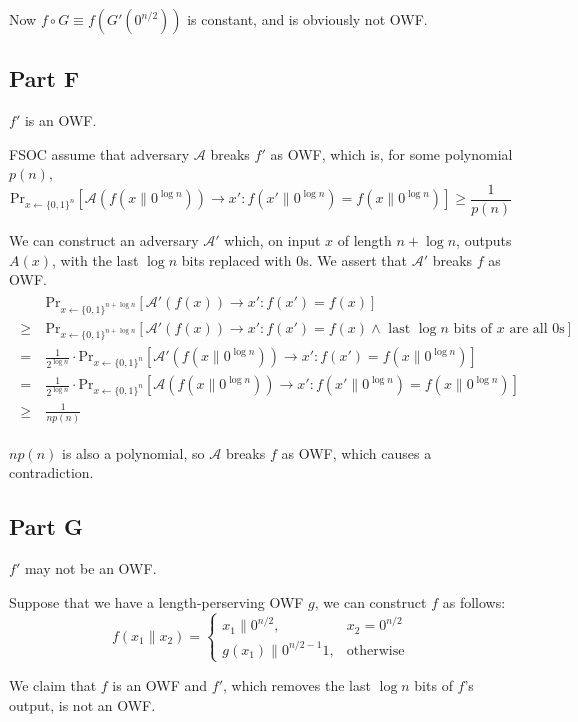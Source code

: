 \documentclass[8pt]{article}
\theoremstyle{compact}
\def\ge{\geqslant}
\begin{document}
Now $f \circ G \equiv f(G'(0^{n/2}))$ is constant, and is obviously not OWF. 
\subsection*{Part F}
$f'$ is an OWF.

FSOC assume that adversary $\mathcal A$ breaks $f'$ as OWF, which is, for some polynomial $p(n)$, $$\text{Pr}_{x \gets \{0, 1\}^{n}}[\mathcal A(f(x \| 0^{\log n})) \to x': f(x' \| 0^{\log n}) = f(x \| 0^{\log n})] \ge \frac{1}{p(n)}$$

We can construct an adversary $\mathcal A'$ which, on input $x$ of length $n + \log n$, outputs $A(x)$, with the last $\log n$ bits replaced with $0$s. We assert that $\mathcal A'$ breaks $f$ as OWF.
\begin{align*}
	\begin{split}
		&\text{Pr}_{x \gets \{0, 1\}^{n+\log n}}[\mathcal A'(f(x)) \to x': f(x') = f(x)] \\\ge\ & \text{Pr}_{x \gets \{0, 1\}^{n+\log n}}[\mathcal A'(f(x)) \to x': f(x') = f(x) \wedge \text{ last } \log n \text{ bits of } x \text{ are all } 0\text{s}] \\=\ &  \frac{1}{2^{\log n}} \cdot \text{Pr}_{x \gets \{0, 1\}^{n}}[\mathcal A'(f(x \| 0^{\log n})) \to x': f(x') = f(x \| 0^{\log n})]
		\\=\ &  \frac{1}{2^{\log n}} \cdot \text{Pr}_{x \gets \{0, 1\}^{n}}[\mathcal A(f(x \| 0^{\log n})) \to x': f(x' \| 0^{\log n}) = f(x \| 0^{\log n})]
		\\\ge\ &\frac{1}{np(n)}
	\end{split}
\end{align*}

$np(n)$ is also a polynomial, so $\mathcal A$ breaks $f$ as OWF, which causes a contradiction.
\subsection*{Part G}
$f'$ may not be an OWF.

Suppose that we have a length-perserving OWF $g$, we can construct $f$ as follows:
$$f(x_1 \| x_2) = \begin{cases}
	x_1 \| 0^{n/2}, & x_2 = 0^{n/2} \\
	g(x_1) \| 0^{n/2-1}1, & \text{otherwise}
\end{cases}$$

We claim that $f$ is an OWF and $f'$, which removes the last $\log n$ bits of $f$'s output, is not an OWF.
\end{document}

